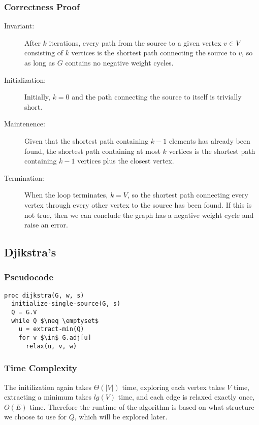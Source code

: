 \documentclass[a4paper,12pt]{article}
\begin{document}
\subsubsection{Correctness Proof}
\begin{description}
\item [Invariant: ] After $k$ iterations, every path from the source to a given vertex $v \in V$ consisting of $k$ vertices is the shortest path connecting the source to $v$, so as long as $G$ contains no negative weight cycles.
\item [Initialization: ] Initially, $k = 0$ and the path connecting the source to itself is trivially short.
\item [Maintenence: ] Given that the shortest path containing $k-1$ elements has already been found, the shortest path containing at most $k$ vertices is the shortest path containing $k-1$ vertices plus the closest vertex. 
\item [Termination: ] When the loop terminates, $k = V$, so the shortest path connecting every vertex through every other vertex to the source has been found. If this is not true, then we can conclude the graph has a negative weight cycle and raise an error.
\end{description}
\subsection{Djikstra's}
\subsubsection{Pseudocode}
\begin{lstlisting}[mathescape=true]
proc dijkstra(G, w, s)
  initialize-single-source(G, s)
  Q = G.V
  while Q $\neq \emptyset$
    u = extract-min(Q)
    for v $\in$ G.adj[u]
      relax(u, v, w)
\end{lstlisting}
\subsubsection{Time Complexity}
The initilization again takes $\Theta(|V|)$ time, exploring each vertex takes $V$ time, extracting a minimum takes $lg(V)$ time, and each edge is relaxed exactly once, $O(E)$ time. Therefore the runtime of the algorithm is based on what structure we choose to use for $Q$, which will be explored later.
\end{document}
